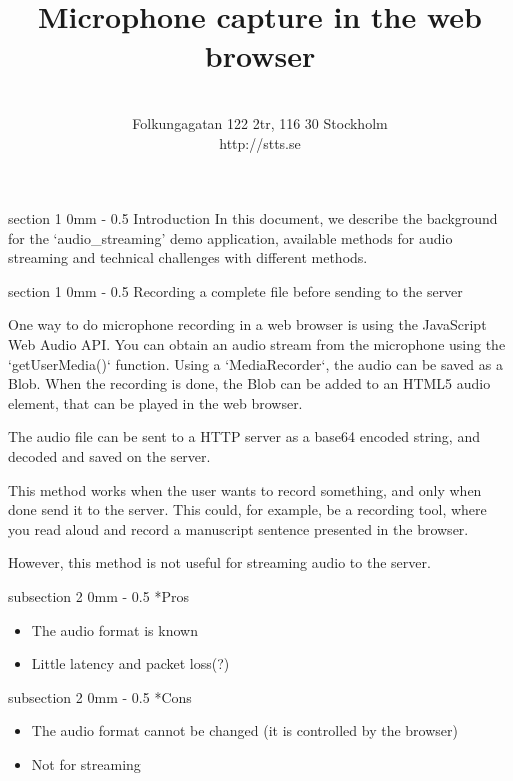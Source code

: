 \documentclass[11pt, a4paper, twoside]{article}
\title{ Microphone capture in the web browser }
\author{ \stts \\
  Folkungagatan 122 2tr, 116 30 Stockholm\\
  http://stts.se }
\makeatletter
\renewcommand{\subsection}{\@startsection
  {subsection}%
  {2}%
  {0mm}%
  {-\baselineskip}%
  {0.5\baselineskip}%
  {\bfseries\sffamily\large}}%
\renewcommand{\section}{\@startsection
  {section}%
  {1}%
  {0mm}%
  {-\baselineskip}%
  {0.5\baselineskip}%
  {\bfseries\sffamily\Large}}%
\makeatother
\begin{document}
\maketitle
\cfoot{\thepage (\pageref{LastPage})}  


\section{Introduction}
In this document, we describe the background for the
`audio\_streaming' demo application, available methods for audio
streaming and technical challenges with different methods.

\section{Recording a complete file before sending to the server}

One way to do microphone recording in a web browser is using the
JavaScript Web Audio API. You can obtain an audio stream from the
microphone using the `getUserMedia()` function. Using a
`MediaRecorder`, the audio can be saved as a Blob. When the recording
is done, the Blob can be added to an HTML5 audio element, that can be
played in the web browser.

The audio file can be sent to a HTTP server as a base64 encoded
string, and decoded and saved on the server.

This method works when the user wants to record something, and only
when done send it to the server. This could, for example, be a
recording tool, where you read aloud and record a manuscript sentence
presented in the browser.

However, this method is not useful for streaming audio to the server.

\subsection*{Pros}
\begin{itemize}
\item The audio format is known
\item Little latency and packet loss(?)
\end{itemize}

\subsection*{Cons}
\begin{itemize}
\item The audio format cannot be changed (it is controlled by the browser)
\item Not for streaming
\end{itemize}
\end{document}
